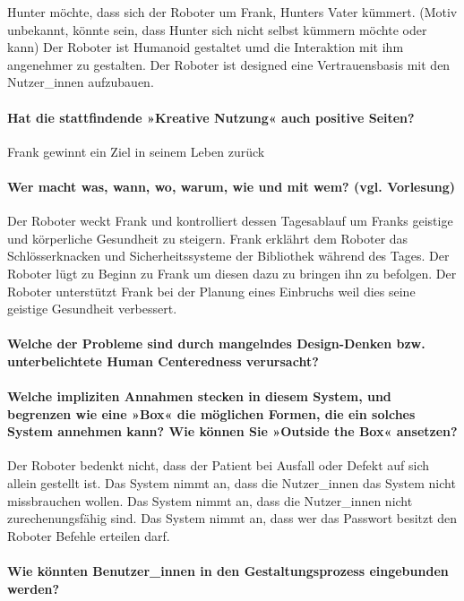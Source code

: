 \documentclass[sigchi-a, authorversion]{acmart}
\begin{document}
Hunter möchte, dass sich der Roboter um Frank, Hunters Vater kümmert. (Motiv unbekannt, könnte sein, dass Hunter sich nicht selbst kümmern möchte oder kann)
Der Roboter ist Humanoid gestaltet umd die Interaktion mit ihm angenehmer zu gestalten.
Der Roboter ist designed eine Vertrauensbasis mit den Nutzer\_innen aufzubauen.

\paragraph{Hat die stattfindende »Kreative Nutzung« auch positive Seiten?}

Frank gewinnt ein Ziel in seinem Leben zurück

\paragraph{Wer macht was, wann, wo, warum, wie und mit wem? (vgl. Vorlesung)}

Der Roboter weckt Frank und kontrolliert dessen Tagesablauf um Franks geistige und körperliche Gesundheit zu steigern.
Frank erklährt dem Roboter das Schlösserknacken und Sicherheitssysteme der Bibliothek während des Tages.
Der Roboter lügt zu Beginn zu Frank um diesen dazu zu bringen ihn zu befolgen.
Der Roboter unterstützt Frank bei der Planung eines Einbruchs weil dies seine geistige Gesundheit verbessert.

\paragraph{Welche der Probleme sind durch mangelndes Design-Denken bzw. unterbelichtete Human Centeredness
verursacht?}

\paragraph
{Welche impliziten Annahmen stecken in diesem System, und begrenzen wie eine »Box« die möglichen Formen, die ein solches System annehmen kann? Wie können Sie »Outside the Box« ansetzen?}

Der Roboter bedenkt nicht, dass der Patient bei Ausfall oder Defekt auf sich allein gestellt ist.
Das System nimmt an, dass die Nutzer\_innen das System nicht missbrauchen wollen.
Das System nimmt an, dass die Nutzer\_innen nicht zurechenungsfähig sind.
Das System nimmt an, dass wer das Passwort besitzt den Roboter Befehle erteilen darf.

\paragraph{Wie könnten Benutzer\_innen in den Gestaltungsprozess eingebunden werden?}
\end{document}
